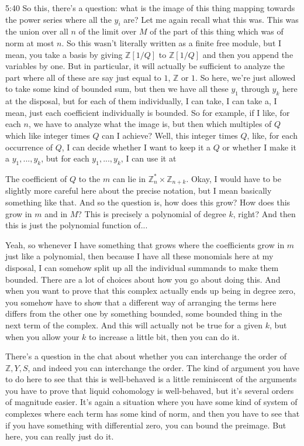 \begin{unfinished}{5:40}
So this, there's a question: what is the image of this thing mapping towards the power series where all the $y_i$ are? Let me again recall what this was. This was the union over all $n$ of the limit over $M$ of the part of this thing which was of norm at most $n$. So this wasn't literally written as a finite free module, but I mean, you take a basis by giving $\mathbb{Z}[1/Q]$ to $\mathbb{Z}[1/Q]$ and then you append the variables by one. But in particular, it will actually be sufficient to analyze the part where all of these are say just equal to $1$, $\mathbb{Z}$ or $1$. So here, we're just allowed to take some kind of bounded sum, but then we have all these $y_1$ through $y_k$ here at the disposal, but for each of them individually, I can take, I can take a, I mean, just each coefficient individually is bounded. So for example, if I like, for each $n$, we have to analyze what the image is, but then which multiples of $Q$ which like integer times $Q$ can I achieve? Well, this integer times $Q$, like, for each occurrence of $Q$, I can decide whether I want to keep it a $Q$ or whether I make it a $y_1,...,y_k$, but for each $y_1,...,y_k$, I can use it at

The coefficient of $Q$ to the $m$ can lie in $\mathbb{Z}_n^* \times \mathbb{Z}_{n+k}$. Okay, I would have to be slightly more careful here about the precise notation, but I mean basically something like that. And so the question is, how does this grow? How does this grow in $m$ and in $M$? This is precisely a polynomial of degree $k$, right? And then this is just the polynomial function of...

Yeah, so whenever I have something that grows where the coefficients grow in $m$ just like a polynomial, then because I have all these monomials here at my disposal, I can somehow split up all the individual summands to make them bounded. There are a lot of choices about how you go about doing this. And when you want to prove that this complex actually ends up being in degree zero, you somehow have to show that a different way of arranging the terms here differs from the other one by something bounded, some bounded thing in the next term of the complex. And this will actually not be true for a given $k$, but when you allow your $k$ to increase a little bit, then you can do it.

There's a question in the chat about whether you can interchange the order of $\mathbb{Z} , Y ,S$, and indeed you can interchange the order. The kind of argument you have to do here to see that this is well-behaved is a little reminiscent of the arguments you have to prove that liquid cohomology is well-behaved, but it's several orders of magnitude easier. It's again a situation where you have some kind of system of complexes where each term has some kind of norm, and then you have to see that if you have something with differential zero, you can bound the preimage. But here, you can really just do it.


\end{unfinished}
